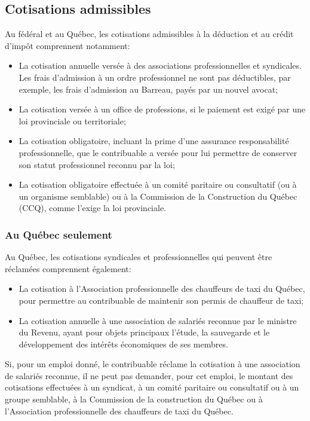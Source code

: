\subsection{Cotisations admissibles}
Au fédéral et au Québec, les cotisations admissibles à la déduction et au crédit d'impôt comprennent notamment:
\begin{itemize}
	\item La cotisation annuelle versée à des associations professionnelles et syndicales. Les frais d'admission à un ordre professionnel ne sont pas déductibles, par exemple, les frais d'admission au Barreau, payés par un nouvel avocat;
	\item La cotisation versée à un office de professions, si le paiement est exigé par une loi provinciale ou territoriale;
	\item La cotisation obligatoire, incluant la prime d'une assurance responsabilité professionnelle, que le contribuable a versée pour lui permettre de conserver son statut professionnel reconnu par la loi; 
	\item La cotisation obligatoire effectuée à un comité paritaire ou consultatif (ou à un organisme semblable) ou à la Commission de la Construction du Québec (CCQ), comme l'exige la loi provinciale.
\end{itemize}

\subsubsection{Au Québec seulement}
Au Québec, les cotisations syndicales et professionnelles qui peuvent être réclamées comprennent également:
\begin{itemize}
	\item La cotisation à l'Association professionnelle des chauffeurs de taxi du Québec, pour permettre au contribuable de maintenir son permis de chauffeur de taxi;
	\item La cotisation annuelle à une association de salariés reconnue par le ministre du Revenu, ayant pour objets principaux l'étude, la sauvegarde et le développement des intérêts économiques de ses membres.
\end{itemize}

Si, pour un emploi donné, le contribuable réclame la cotisation à une association de salariés reconnue, il ne peut pas demander, pour cet emploi, le montant des cotisations effectuées à un syndicat, à un comité paritaire ou consultatif ou à un groupe semblable, à la Commission de la construction du Québec ou à l'Association professionnelle des chauffeurs de taxi du Québec.


